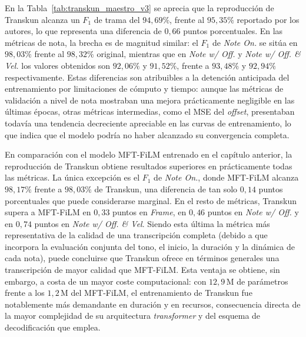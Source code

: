 \documentclass[11pt,spanish,listoffigures,listoftables]{tfgetsinf}
\begin{document}
En la Tabla~\ref{tab:transkun_maestro_v3} se aprecia que la reproducción de 
Transkun alcanza un $F_1$ de trama del $94{,}69\%$, frente al $95{,}35\%$ 
reportado por los autores, lo que representa una diferencia de $0{,}66$ puntos 
porcentuales. En las métricas de nota, la brecha es de magnitud similar: el $F_1$ 
de \textit{Note On.} se sitúa en $98{,}03\%$ frente al $98{,}32\%$ original, 
mientras que en \textit{Note w/ Off.} y \textit{Note w/ Off. \& Vel.} los valores 
obtenidos son $92{,}06\%$ y $91{,}52\%$, frente a $93{,}48\%$ y $92{,}94\%$ 
respectivamente. Estas diferencias son atribuibles a la detención anticipada del 
entrenamiento por limitaciones de cómputo y tiempo: aunque las métricas de 
validación a nivel de nota mostraban una mejora prácticamente negligible en las 
últimas épocas, otras métricas intermedias, como el MSE del \textit{offset}, 
presentaban todavía una tendencia decreciente apreciable en las curvas de 
entrenamiento, lo que indica que el modelo podría no haber alcanzado su convergencia 
completa.

En comparación con el modelo MFT-FiLM entrenado en el capítulo anterior, la 
reproducción de Transkun obtiene resultados superiores en prácticamente todas las métricas.
La única excepción es el $F_1$ de \textit{Note On.}, donde 
MFT-FiLM alcanza $98{,}17\%$ frente a $98{,}03\%$ de Transkun, una diferencia 
de tan solo $0{,}14$ puntos porcentuales que puede considerarse marginal. En el 
resto de métricas, Transkun supera a MFT-FiLM en $0{,}33$ puntos en \textit{Frame}, 
en $0{,}46$ puntos en \textit{Note w/ Off.} y en $0{,}74$ puntos en 
\textit{Note w/ Off. \& Vel}. Siendo esta última la métrica más representativa 
de la calidad de una transcripción completa (debido a que incorpora la evaluación 
conjunta del tono, el inicio, la duración y la dinámica de cada nota), puede 
concluirse que Transkun ofrece en términos generales una transcripción de mayor 
calidad que MFT-FiLM. Esta ventaja se obtiene, sin embargo, a costa de un mayor coste computacional: con $12{,}9\,\text{M}$ de parámetros frente a los 
$1{,}2\,\text{M}$ del MFT-FiLM, el entrenamiento de Transkun fue notablemente 
más demandante en duración y en recursos, consecuencia directa de la mayor 
complejidad de su arquitectura \textit{transformer} y del esquema de 
decodificación que emplea.
\end{document}
